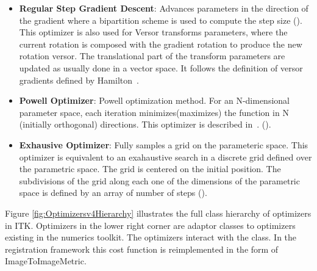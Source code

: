 \begin{itemize}
\item \textbf{Regular Step Gradient Descent}: Advances parameters in the
direction of the gradient where a bipartition scheme is used to compute
the step size ().
This optimizer is also used for Versor transforms parameters, where the
current rotation is composed with the gradient rotation to produce the
new rotation versor. The translational part of the transform parameters
are updated as usually done in a vector space. It follows the definition
of versor gradients defined by Hamilton~\cite{Hamilton1866}.

\item \textbf{Powell Optimizer}: Powell optimization method.  For an
N-dimensional parameter space, each iteration minimizes(maximizes) the function
in N (initially orthogonal) directions. This optimizer is described
in~\cite{Press1992}.  ().

\item \textbf{Exhausive Optimizer}: Fully samples a grid on the parameteric space.
This optimizer is equivalent to an exahaustive search in a discrete grid defined
over the parametric space. The grid is centered on the initial position. The
subdivisions of the grid along each one of the dimensions of the parametric space
is defined by an array of number of steps
().

\end{itemize}

Figure \ref{fig:Optimizersv4Hierarchy} illustrates the full class hierarchy of
optimizers in ITK. Optimizers in the lower right corner are adaptor classes
to optimizers existing in the  numerics toolkit. The optimizers
interact with the  class. In the registration framework
this cost function is reimplemented in the form of ImageToImageMetric.





